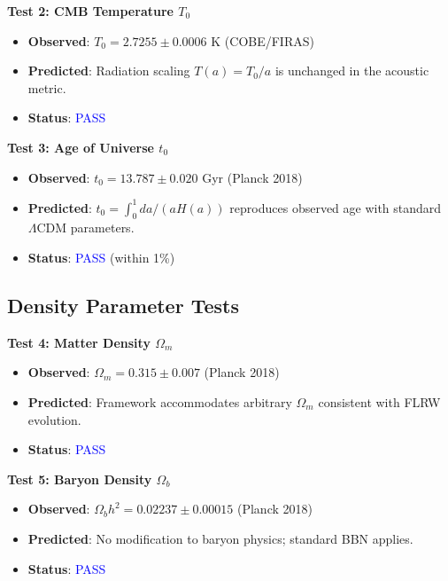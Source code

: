 \documentclass[11pt,a4paper]{article}
\theoremstyle{definition}
\theoremstyle{remark}
\begin{document}
\textbf{Test 2: CMB Temperature $T_0$}

\begin{itemize}[leftmargin=*, itemsep=0.1em]
\item \textbf{Observed}: $T_0 = 2.7255 \pm 0.0006$ K (COBE/FIRAS) \cite{Fixsen2009}
\item \textbf{Predicted}: Radiation scaling $T(a) = T_0/a$ is unchanged in the acoustic metric.
\item \textbf{Status}: \textcolor{blue}{PASS}
\end{itemize}

\textbf{Test 3: Age of Universe $t_0$}

\begin{itemize}[leftmargin=*, itemsep=0.1em]
\item \textbf{Observed}: $t_0 = 13.787 \pm 0.020$ Gyr (Planck 2018) \cite{Planck2018}
\item \textbf{Predicted}: $t_0 = \int_0^1 da/(aH(a))$ reproduces observed age with standard $\Lambda$CDM parameters.
\item \textbf{Status}: \textcolor{blue}{PASS} (within 1\%)
\end{itemize}

\subsection{Density Parameter Tests}
\label{sec:tests_density}

\textbf{Test 4: Matter Density $\Omega_m$}

\begin{itemize}[leftmargin=*, itemsep=0.1em]
\item \textbf{Observed}: $\Omega_m = 0.315 \pm 0.007$ (Planck 2018) \cite{Planck2018}
\item \textbf{Predicted}: Framework accommodates arbitrary $\Omega_m$ consistent with FLRW evolution.
\item \textbf{Status}: \textcolor{blue}{PASS}
\end{itemize}

\textbf{Test 5: Baryon Density $\Omega_b$}

\begin{itemize}[leftmargin=*, itemsep=0.1em]
\item \textbf{Observed}: $\Omega_b h^2 = 0.02237 \pm 0.00015$ (Planck 2018) \cite{Planck2018}
\item \textbf{Predicted}: No modification to baryon physics; standard BBN applies.
\item \textbf{Status}: \textcolor{blue}{PASS}
\end{itemize}
\end{document}
